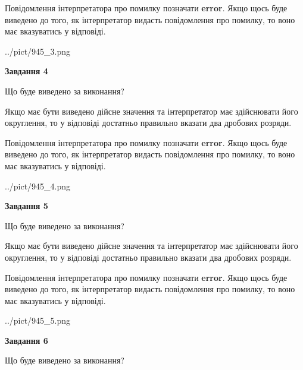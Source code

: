 \documentclass[12pt, ukrainian]{article}
\begin{document}
{\begin {Large}
Повідомлення інтерпретатора про помилку позначати \textbf{error}.
Якщо щось буде виведено до того, як інтерпретатор видасть повідомлення про помилку, 
то воно має вказуватись у відповіді. \par

\begin{center}
	{../pict/945_3.png}
\end{center}
\newpage

{\begin {center}\textbf{Завдання 4}\end {center}}\par
Що буде виведено за виконання? \par

Якщо має бути виведено дійсне значення та інтерпретатор має здійснювати його округлення, 
то у відповіді достатньо правильно вказати два дробових розряди.

Повідомлення інтерпретатора про помилку позначати \textbf{error}.
Якщо щось буде виведено до того, як інтерпретатор видасть повідомлення про помилку, 
то воно має вказуватись у відповіді. \par

\begin{center}
	{../pict/945_4.png}
\end{center}
\newpage

{\begin {center}\textbf{Завдання 5}\end {center}}\par
Що буде виведено за виконання? \par

Якщо має бути виведено дійсне значення та інтерпретатор має здійснювати його округлення, 
то у відповіді достатньо правильно вказати два дробових розряди.

Повідомлення інтерпретатора про помилку позначати \textbf{error}.
Якщо щось буде виведено до того, як інтерпретатор видасть повідомлення про помилку, 
то воно має вказуватись у відповіді. \par

\begin{center}
	{../pict/945_5.png}
\end{center}
\newpage

{\begin {center}\textbf{Завдання 6}\end {center}}\par
Що буде виведено за виконання? \par


\end{Large}}
\end{document}

